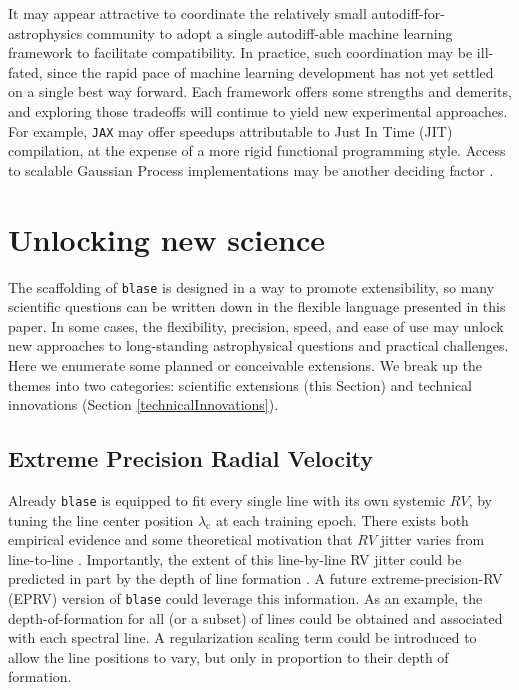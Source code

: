 \documentclass[twocolumn]{aastex631}
\begin{document}
It may appear attractive to coordinate the relatively small autodiff-for-astrophysics community to adopt a single autodiff-able machine learning framework to facilitate compatibility.  In practice, such coordination may be ill-fated, since the rapid pace of machine learning development has not yet settled on a single best way forward.  Each framework offers some strengths and demerits, and exploring those tradeoffs will continue to yield new experimental approaches.  For example, \texttt{JAX} may offer speedups attributable to Just In Time (JIT) compilation, at the expense of a more rigid functional programming style.  Access to scalable Gaussian Process implementations may be another deciding factor \citep{2022arXiv220908940A}.

\section{Unlocking new science}\label{secFutureWork}

The scaffolding of \texttt{blase} is designed in a way to promote extensibility, so many scientific questions can be written down in the flexible language presented in this paper.  In some cases, the flexibility, precision, speed, and ease of use may unlock new approaches to long-standing astrophysical questions and practical challenges. Here we enumerate some planned or conceivable extensions.  We break up the themes into two categories: scientific extensions (this Section) and technical innovations (Section \ref{technicalInnovations}).

\subsection{Extreme Precision Radial Velocity} \label{eprv}

Already \texttt{blase} is equipped to fit every single line with its own systemic $RV$, by tuning the line center position $\lambda_\mathrm{c}$ at each training epoch.  There exists both empirical evidence and some theoretical motivation that $RV$ jitter varies from line-to-line \citep{2018A&A...620A..47D}.  Importantly, the extent of this line-by-line RV jitter could be predicted in part by the depth of line formation \citep{2021A&A...653A..43C, 2022A&A...664A..34A}.  A future extreme-precision-RV (EPRV) version of \texttt{blase} could leverage this information.  As an example, the depth-of-formation for all (or a subset) of lines could be obtained and associated with each spectral line.  A regularization scaling term could be introduced to allow the line positions to vary, but only in proportion to their depth of formation.
\end{document}
